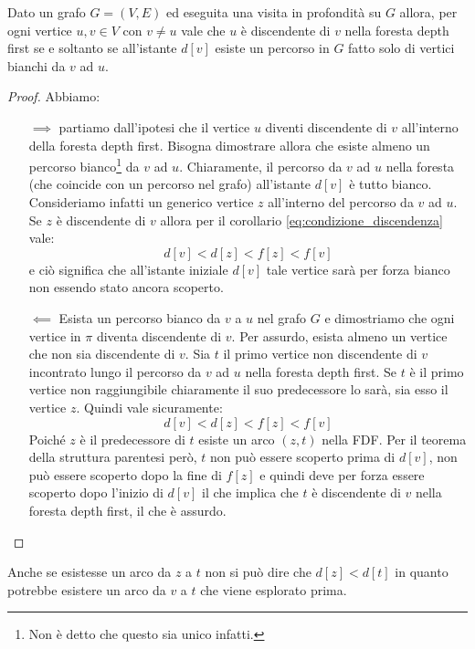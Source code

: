 \begin{teorbox}
Dato un grafo $G=(V,E)$ ed eseguita una visita in profondità su $G$ allora, per ogni vertice $u,v \in V$ con $v \neq u$ vale che $u$ è discendente di $v$ nella foresta depth first se e soltanto se all'istante $d[v]$ esiste un percorso in $G$ fatto solo di vertici bianchi da $v$ ad $u$.
\end{teorbox}

\begin{proof}Abbiamo:
\begin{enumerate}
	\item[$\implies$] partiamo dall'ipotesi che il vertice $u$ diventi discendente di $v$ all'interno della foresta depth first. Bisogna dimostrare allora che esiste almeno un percorso bianco\footnote{Non è detto che questo sia unico infatti.} da $v$ ad $u$. Chiaramente, il percorso da $v$ ad $u$ nella foresta (che coincide con un percorso nel grafo) all'istante $d[v]$ è tutto bianco. Consideriamo infatti un generico vertice $z$ all'interno del percorso da $v$ ad $u$. Se $z$ è discendente di $v$ allora per il corollario \ref{eq:condizione_discendenza} vale:\[d[v]<d[z]<f[z]<f[v]\] e ciò significa che all'istante iniziale $d[v]$ tale vertice sarà per forza bianco non essendo stato ancora scoperto.

	\item[$\impliedby$] Esista un percorso bianco da $v$ a $u$ nel grafo $G$ e dimostriamo che ogni vertice in $\pi$ diventa discendente di $v$. Per assurdo, esista almeno un vertice che non sia discendente di $v$. Sia $t$ il primo vertice non discendente di $v$ incontrato lungo il percorso da $v$ ad $u$ nella foresta depth first. Se $t$ è il primo vertice non raggiungibile chiaramente il suo predecessore lo sarà, sia esso il vertice $z$. Quindi vale sicuramente: \[d[v]<d[z]<f[z]<f[v]\]
	Poiché $z$ è il predecessore di $t$ esiste un arco $(z,t)$ nella FDF. Per il teorema della struttura parentesi però, $t$ non può essere scoperto prima di $d[v]$, non può essere scoperto dopo la fine di $f[z]$ e quindi deve per forza essere scoperto dopo l'inizio di $d[v]$ il che implica che $t$ è discendente di $v$ nella foresta depth first, il che è assurdo.
\end{enumerate}
\end{proof}


\begin{osservation}
		Anche se esistesse un arco da $z$ a $t$ non si può dire che $d[z]<d[t]$ in quanto potrebbe esistere un arco da $v$ a $t$ che viene esplorato prima.
\end{osservation}

